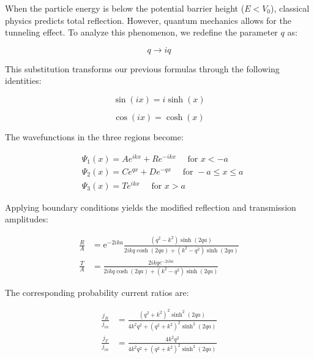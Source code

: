 \documentclass[italian]{HKNdocument}
\begin{document}
When the particle energy is below the potential barrier height ($E < V_0$), classical physics predicts total reflection. However, quantum mechanics allows for the tunneling effect. To analyze this phenomenon, we redefine the parameter $q$ as:

\begin{equation*}
q \rightarrow i q \tag{6.73}
\end{equation*}

This substitution transforms our previous formulas through the following identities:

\begin{equation*}
\sin (i x)=i \sinh (x) \tag{6.75}
\end{equation*}

\begin{equation*}
\cos (i x)=\cosh (x) \tag{6.76}
\end{equation*}

The wavefunctions in the three regions become:

\begin{align*}
& \Psi_{1}(x)=A e^{i k x}+R e^{-i k x} \quad \text { for } x<-a \\
& \Psi_{2}(x)=C e^{q x}+D e^{-q x} \quad \text { for }-a \leq x \leq a  \tag{6.77}\\
& \Psi_{3}(x)=T e^{i k x} \quad \text { for } x>a
\end{align*}

Applying boundary conditions yields the modified reflection and transmission amplitudes:

\begin{align*}
\frac{R}{A} & =\mathrm{e}^{-2 i k a} \frac{\left(q^{2}-k^{2}\right) \sinh (2 q a)}{2 i k q \cosh (2 q a)+\left(k^{2}-q^{2}\right) \sinh (2 q a)} \\
\frac{T}{A} & =\frac{2 i k q e^{-2 i k a}}{2 i k q \cosh (2 q a)+\left(k^{2}-q^{2}\right) \sinh (2 q a)} \tag{6.78}
\end{align*}

The corresponding probability current ratios are:

\begin{align*}
\frac{j_{R}}{j_{i n}} & =\frac{\left(q^{2}+k^{2}\right)^{2} \sinh ^{2}(2 q a)}{4 k^{2} q^{2}+\left(q^{2}+k^{2}\right)^{2} \sinh ^{2}(2 q a)}  \tag{6.79}\\
\frac{j_{T}}{j_{i n}} & =\frac{4 k^{2} q^{2}}{4 k^{2} q^{2}+\left(q^{2}+k^{2}\right)^{2} \sinh ^{2}(2 q a)}
\end{align*}
\end{document}
